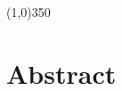 \tableofcontents
\vspace{2cm}

\begin{center}
\line(1,0){350}
\end{center}

\newpage

\section*{Abstract}

\lipsum[1]
